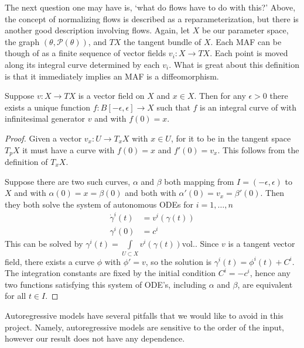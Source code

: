 The next question one may have is, `what do flows have to do with this?' Above, the concept of normalizing flows is described as a reparameterization, but there is another good description involving flows. Again, let $X$ be our parameter space, the graph $(\theta,\mathcal{P}(\theta))$, and $TX$ the tangent bundle of $X$. Each MAF can be though of as a finite sequence of vector fields $v_i:X \rightarrow TX$. Each point is moved along its integral curve determined by each $v_i$. What is great about this definition is that it immediately implies an MAF is a diffeomorphism. 
\begin{prop}
Suppose $v:X \rightarrow TX$ is a vector field on $X$ and $x \in X$. Then for any $\epsilon>0$ there exists a unique function $f:B[-\epsilon,\epsilon]\rightarrow X$ such that $f$ is an integral curve of with infinitesimal generator $v$ and with $f(0) = x$.  
\end{prop}
\begin{proof}
Given a vector $v_x:U\rightarrow T_x X$ with $x\in U$, for it to be in the tangent space $T_pX$ it must have a curve with $f(0)=x$ and $f'(0)=v_x$. This follows from the definition of $T_xX$.

Suppose there are two such curves, $\alpha$ and $\beta$ both mapping from $I=(-\epsilon,\epsilon)$ to $X$ and with $\alpha(0) = x = \beta(0)$ and both with $\alpha'(0) = v_x = \beta'(0)$. Then they both solve the system of autonomous ODEs for $i=1,\dots,n$
\begin{equation}
\begin{split}
	\dot{\gamma}^i(t) &= v^i(\gamma(t)) \\
	\gamma^i(0) &= c^i
\end{split}
\end{equation}
This can be solved by $\gamma^i(t) = \int\limits_{U\subset X}v^i(\gamma(t))\text{vol.}$. Since $v$ is a tangent vector field, there exists a curve $\phi$ with $\phi' = v$, so the solution is $\gamma^i(t) = \phi^i(t)+C^i$. The integration constants are fixed by the initial condition $C^i=-c^i$, hence any two functions satisfying this system of ODE's, including $\alpha$ and $\beta$, are equivalent for all $t\in I$.
\end{proof}
Autoregressive models have several pitfalls that we would like to avoid in this project. Namely, autoregressive models are sensitive to the order of the input, however our result does not have any dependence. 
